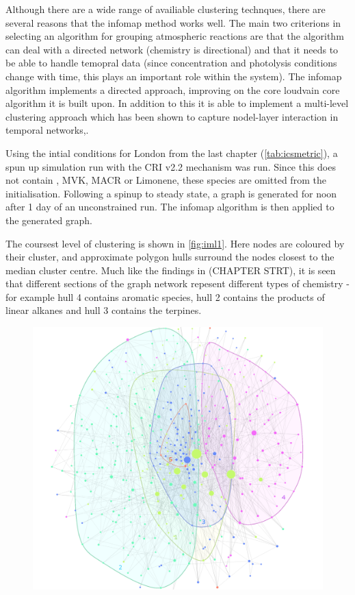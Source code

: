 Although there are a wide range of availiable clustering technques, there are several reasons that the infomap method works well. The main two criterions in selecting an algorithm for grouping atmospheric reactions are that the algorithm can deal with a directed network (chemistry is directional) and that it needs to be able to handle temopral data (since concentration and photolysis conditions change with time, this plays an important role within the system). The infomap algorithm implements a directed approach, improving on the core loudvain core algorithm it is built upon. In addition to this it is able to implement a multi-level clustering approach which has been shown to capture nodel-layer interaction in temporal networks,\citep{infointermittent}.

Using the intial conditions for London from the last chapter (\autoref{tab:icsmetric}), a spun up simulation run with the CRI v2.2 mechanism was run. Since this does not contain , MVK, MACR or Limonene, these species are omitted from the initialisation. Following a spinup to steady state, a graph is generated for noon after 1 day of an unconstrained run. The infomap algorithm is then applied to the generated graph. 

The coursest level of clustering is shown in \autoref{fig:iml1}. Here nodes are coloured by their cluster, and approximate polygon hulls surround the nodes closest to the median cluster centre. Much like the findings in (CHAPTER STRT), it is seen that different sections of the graph network repesent different types of chemistry - for example hull 4 contains aromatic species, hull 2 contains the products of linear alkanes and hull 3 contains the terpines.


\begin{figure}[H]
  \centering
  \includegraphics[width=\textwidth]{fig/crigroups.png}
  \caption{\textbf{}}
    \label{fig:iml1}
\end{figure}

